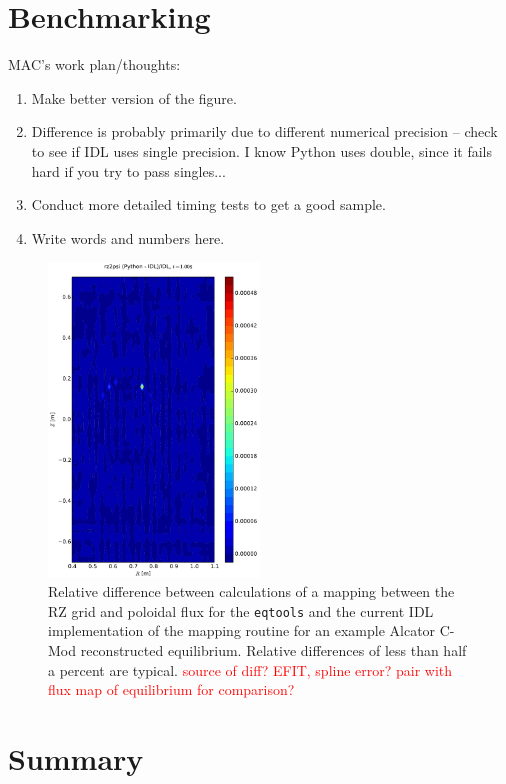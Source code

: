 \documentclass[12pt,floatfix,showpacs]{revtex4-1}
\newcommand{\note}[1]{\textcolor{red}{#1}}
\newcommand{\eqtools}{\texttt{eqtools}\xspace}
\begin{document}
\section{Benchmarking}\label{sec:benchmark}

MAC's work plan/thoughts:
\begin{enumerate}
	\item Make better version of the figure.
	\item Difference is probably primarily due to different numerical precision -- check to see if IDL uses single precision. I know Python uses double, since it fails hard if you try to pass singles...
	\item Conduct more detailed timing tests to get a good sample.
	\item Write words and numbers here.
\end{enumerate}

\begin{figure}[ht]
 \includegraphics[width=0.5\textwidth]{graphics/RZ2psi_rel_diff.pdf}
 \caption{Relative difference between calculations of a mapping between the RZ grid and poloidal flux for the \eqtools and the current IDL implementation of the mapping routine for an example Alcator C-Mod reconstructed equilibrium.  Relative differences of less than half a percent are typical.  \note{source of diff?  EFIT, spline error?  pair with flux map of equilibrium for comparison?}}
 \label{fig:rz2psi_diff}
\end{figure}

\section{Summary}\label{sec:summary}
\end{document}
